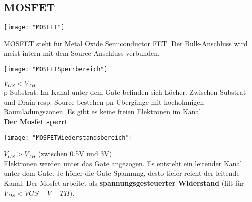 \subsection{MOSFET}
\begin{minipage}[t]{0.3\textwidth}
	\vspace{0pt}								%
	\texttt{[image: "MOSFET"]}
\end{minipage}\hspace{0.05\textwidth}
\begin{minipage}[t]{0.65\textwidth}
	\vspace{0pt}								%
	MOSFET steht für Metal Oxide Semiconductor FET. Der Bulk-Anschluss wird meist intern mit dem
	Source-Anschluss verbunden. \\
\end{minipage}
\vspace{2mm}

\begin{minipage}[t]{0.3\textwidth}
	\vspace{0pt}								%
	\texttt{[image: "MOSFETSperrbereich"]}
\end{minipage}\hspace{0.05\textwidth}
\begin{minipage}[t]{0.65\textwidth}
	\vspace{0pt}								%
	$V_{GS} < V_{TH}$\\
	p-Substrat: Im Kanal unter dem Gate befinden sich Löcher.
	Zwischen Substrat und Drain resp. Source bestehen pn-Übergänge mit hochohmigen
	Raumladungszonen. Es gibt es keine freien Elektronen im Kanal.\\
	\textbf{Der Mosfet sperrt}
	
\end{minipage}
\vspace{2mm}

\begin{minipage}[t]{0.3\textwidth}
	\vspace{0pt}								%
	\texttt{[image: "MOSFETWiederstandsbereich"]}
\end{minipage}\hspace{0.05\textwidth}
\begin{minipage}[t]{0.65\textwidth}
	\vspace{0pt}								%
	$V_{GS} > V_{TH}$ (zwischen 0.5V und 3V)\\
	Elektronen werden unter das Gate angezogen. Es entsteht ein leitender Kanal unter dem Gate.
	Je höher die Gate-Spannung, desto tiefer reicht der leitende Kanal. Der Mosfet arbeitet als
	\textbf{spannungsgesteuerter Widerstand} (filt für $V_{DS} < V{GS} - V-{TH}$).\\	
\end{minipage}
\vspace{2mm}

